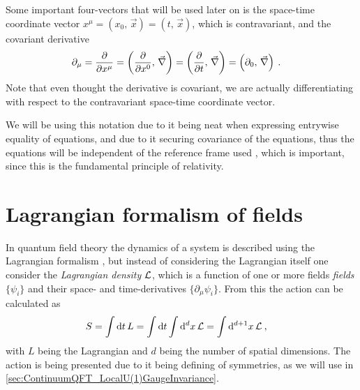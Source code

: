 \documentclass[../main.tex]{subfiles} %
\begin{document}
Some important four-vectors that will be used later on is the space-time coordinate vector $x^\mu = (x_0,\, \Vec{x}) = (t,\, \Vec{x})$, which is contravariant, and the covariant derivative
\begin{align}
    \partial_\mu &= \pdv{}{x^\mu} = \left(\pdv{}{x^0},\, \Vec{\nabla}\right) = \left(\pdv{}{t},\, \Vec{\nabla}\right) = \left(\partial_0,\, \Vec{\nabla}\right)  \: .
\end{align}
Note that even thought the derivative is covariant, we are actually differentiating with respect to the contravariant space-time coordinate vector.

We will be using this notation due to it being neat when expressing entrywise equality of equations, and due to it securing covariance of the equations, thus the equations will be independent of the reference frame used \cite{Uggerhoej_SpecielRelativitetsteori_2016}, which is important, since this is the fundamental principle of relativity.










\section{Lagrangian formalism of fields}

In quantum field theory the dynamics of a system is described using the Lagrangian formalism \cite{peskin_introToQFT_1995,Clark_LagrangianQFT_1988}, but instead of considering the Lagrangian itself one consider the \emph{Lagrangian density} $\mathcal{L}$, which is a function of one or more fields \emph{fields} $\{\psi_i\}$ and their space- and time-derivatives $\{\partial_\mu \psi_i\}$. From this the action can be calculated as
\begin{align}
    S &= \int \dd{t} L = \int \dd{t} \int \dd[d]{x} \mathcal{L} = \int \dd[d+1]{x} \mathcal{L} \: ,
\end{align}
with $L$ being the Lagrangian and $d$ being the number of spatial dimensions. The action is being presented due to it being defining of symmetries, as we will use in \cref{sec:ContinuumQFT_LocalU(1)GaugeInvariance}.
\end{document}
